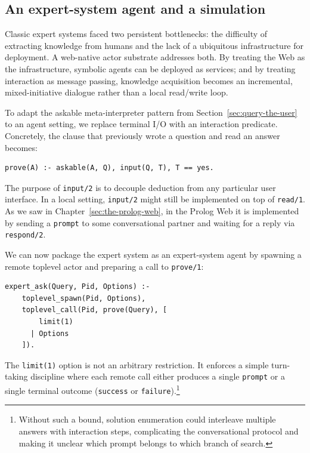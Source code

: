 \subsection{An expert-system agent and a simulation}
\label{sec:expert-system-agent}

Classic expert systems faced two persistent bottlenecks: the difficulty of extracting knowledge from humans and the lack of a ubiquitous infrastructure for deployment. A web-native actor substrate addresses both. By treating the Web as the infrastructure, symbolic agents can be deployed as services; and by treating interaction as message passing, knowledge acquisition becomes an incremental, mixed-initiative dialogue rather than a local read/write loop.

To adapt the askable meta-interpreter pattern from Section~\ref{sec:query-the-user} to an agent setting, we replace terminal I/O with an interaction predicate. Concretely, the clause that previously wrote a question and read an answer becomes:

\begin{verbatim}
prove(A) :- askable(A, Q), input(Q, T), T == yes.
\end{verbatim}

\noindent The purpose of \texttt{input/2} is to decouple deduction from any particular user interface. In a local setting, \texttt{input/2} might still be implemented on top of \texttt{read/1}. As we saw in Chapter~\ref{sec:the-prolog-web}, in the Prolog Web it is implemented by sending a \texttt{prompt} to some conversational partner and waiting for a reply via \texttt{respond/2}.

We can now package the expert system as an expert-system agent by spawning a remote toplevel actor and preparing a call to \texttt{prove/1}:

\begin{verbatim}
expert_ask(Query, Pid, Options) :-
    toplevel_spawn(Pid, Options),
    toplevel_call(Pid, prove(Query), [
        limit(1)
      | Options
    ]).
\end{verbatim}

\noindent The \texttt{limit(1)} option is not an arbitrary restriction. It enforces a simple turn-taking discipline where each remote call either produces a single \texttt{prompt} or a single terminal outcome (\texttt{success} or \texttt{failure}).\footnote{Without such a bound, solution enumeration could interleave multiple answers with interaction steps, complicating the conversational protocol and making it unclear which prompt belongs to which branch of search.}

